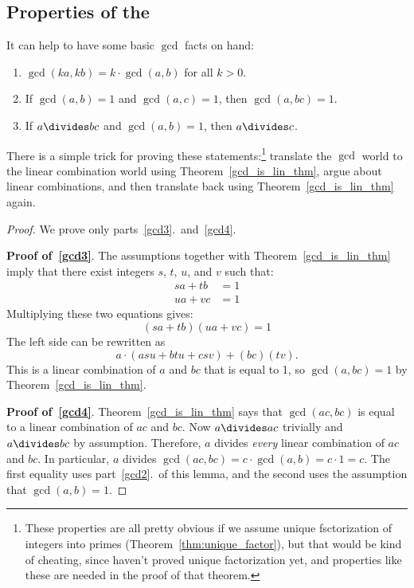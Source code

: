 \begin{editingnotes}
\subsection{Properties of the }

It can help to have some basic $\gcd$ facts on hand:

\begin{lemma}\label{lem:gcd-hold} 
\begin{enumerate}
\item\label{gcd2} $\gcd(k a, k b) = k \cdot \gcd(a, b)$ for all $k > 0$.
\item\label{gcd3} If $\gcd(a, b) = 1$ and $\gcd(a, c) = 1$, then $\gcd(a, bc) = 1$.
\item\label{gcd4} If $a \divides b c$ and $\gcd(a, b) = 1$, then $a \divides c$.

\end{enumerate}
\end{lemma}

There is a simple trick for proving these statements:\footnote{These
  properties are all pretty obvious if we assume unique fsctorization
  of integers into primes (Theorem~\ref{thm:unique_factor}), but that
  would be kind of cheating, since haven't proved unique factorization
  yet, and properties like these are needed in the proof of that
  theorem.} translate the $\gcd$ world to the linear combination world
using Theorem~\ref{gcd_is_lin_thm}, argue about linear combinations,
and then translate back using Theorem~\ref{gcd_is_lin_thm} again.

\begin{proof} We prove only parts~\ref{gcd3}.\ and~\ref{gcd4}.

\textbf{Proof of~\ref{gcd3}}.  The assumptions together with
Theorem~\ref{gcd_is_lin_thm} imply that there exist integers $s$, $t$, $u$,
and $v$ such that:
\begin{align*}
s a + t b & = 1 \\
u a + v c & = 1
\end{align*}
Multiplying these two equations gives:
\[
(s a + t b)(u a + v c) = 1
\]
The left side can be rewritten as
\[
a \cdot (a s u + b t u + c s v) + (bc) (t v).
\]
This is a linear combination of $a$ and $b c$ that is equal to 1, so
$\gcd(a, bc) = 1$ by Theorem~\ref{gcd_is_lin_thm}.

\textbf{Proof of~\ref{gcd4}}.  Theorem~\ref{gcd_is_lin_thm} says that
$\gcd(ac, bc)$ is equal to a linear combination of $ac$ and $bc$.  Now
$a \divides ac$ trivially and $a \divides bc$ by assumption.
Therefore, $a$ divides \emph{every} linear combination of $ac$ and
$bc$.  In particular, $a$ divides $\gcd(ac, bc) = c \cdot \gcd(a, b) =
c\cdot 1 = c$.  The first equality uses part~\ref{gcd2}.\ of this
lemma, and the second uses the assumption that $\gcd(a, b) = 1$.
\end{proof}
\end{editingnotes}

